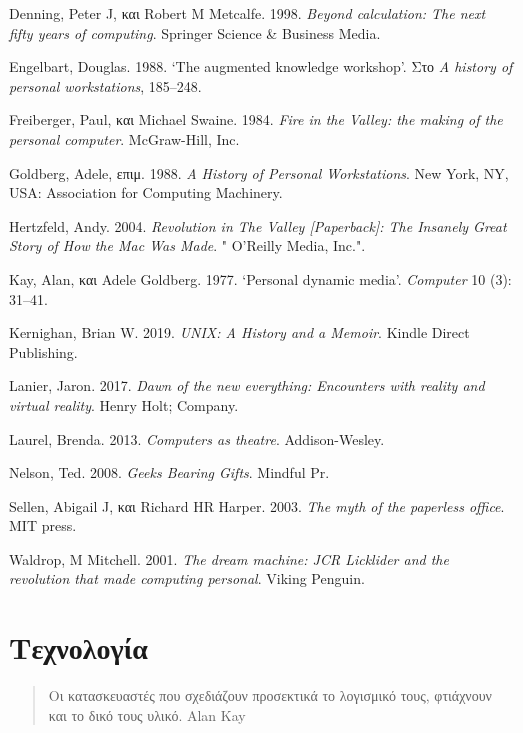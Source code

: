 \documentclass[
]{article}
\newlength{\cslhangindent}
\newlength{\cslentryspacingunit} %
\newenvironment{CSLReferences}[2] %
 {%
  \setlength{\parindent}{0pt}
  \ifodd #1
  \let\oldpar\par
  \def\par{\hangindent=\cslhangindent\oldpar}
  \fi
  \setlength{\parskip}{#2\cslentryspacingunit}
 }%
 {}
\begin{document}
\hypertarget{refs}{}
\begin{CSLReferences}{0}{0}
\end{CSLReferences}

Denning, Peter J, και Robert M Metcalfe. 1998. \emph{Beyond calculation:
The next fifty years of computing}. Springer Science \& Business Media.

Engelbart, Douglas. 1988. {`The augmented knowledge workshop'}. Στο
\emph{A history of personal workstations}, 185--248.

Freiberger, Paul, και Michael Swaine. 1984. \emph{Fire in the Valley:
the making of the personal computer}. McGraw-Hill, Inc.

Goldberg, Adele, επιμ. 1988. \emph{A History of Personal Workstations}.
New York, NY, USA: Association for Computing Machinery.

Hertzfeld, Andy. 2004. \emph{Revolution in The Valley
{{[}}Paperback{{]}}: The Insanely Great Story of How the Mac Was Made}.
" O'Reilly Media, Inc.".

Kay, Alan, και Adele Goldberg. 1977. {`Personal dynamic media'}.
\emph{Computer} 10 (3): 31--41.

Kernighan, Brian W. 2019. \emph{UNIX: A History and a Memoir}. Kindle
Direct Publishing.

Lanier, Jaron. 2017. \emph{Dawn of the new everything: Encounters with
reality and virtual reality}. Henry Holt; Company.

Laurel, Brenda. 2013. \emph{Computers as theatre}. Addison-Wesley.

Nelson, Ted. 2008. \emph{Geeks Bearing Gifts}. Mindful Pr.

Sellen, Abigail J, και Richard HR Harper. 2003. \emph{The myth of the
paperless office}. MIT press.

Waldrop, M Mitchell. 2001. \emph{The dream machine: JCR Licklider and
the revolution that made computing personal}. Viking Penguin.

\hypertarget{ux3c4ux3b5ux3c7ux3bdux3bfux3bbux3bfux3b3ux3afux3b1}{%
\section{Τεχνολογία}\label{ux3c4ux3b5ux3c7ux3bdux3bfux3bbux3bfux3b3ux3afux3b1}}

\begin{quote}
Οι κατασκευαστές που σχεδιάζουν προσεκτικά το λογισμικό τους, φτιάχνουν
και το δικό τους υλικό. Alan Kay
\end{quote}
\end{document}
